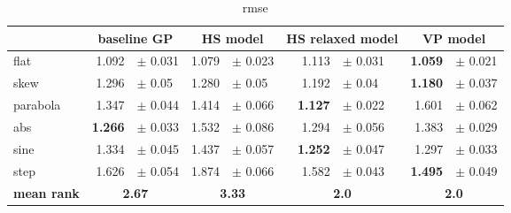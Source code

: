 \begin{table}[] 
 \centering
\begin{tabular}{lrlrlrlrl}
\hline
 &  \multicolumn{2}{c}{baseline GP}  &  \multicolumn{2}{c}{HS model}  &  \multicolumn{2}{c}{HS relaxed model}  &  \multicolumn{2}{c}{VP model}  \\
\hline
flat & 1.092 & $\pm$ 0.031 & 1.079 & $\pm$ 0.023 & 1.113 & $\pm$ 0.031 & \textbf{1.059} & $\pm$ 0.021 \\
skew & 1.296 & $\pm$ 0.05 & 1.280 & $\pm$ 0.05 & 1.192 & $\pm$ 0.04 & \textbf{1.180} & $\pm$ 0.037 \\
parabola & 1.347 & $\pm$ 0.044 & 1.414 & $\pm$ 0.066 & \textbf{1.127} & $\pm$ 0.022 & 1.601 & $\pm$ 0.062 \\
abs & \textbf{1.266} & $\pm$ 0.033 & 1.532 & $\pm$ 0.086 & 1.294 & $\pm$ 0.056 & 1.383 & $\pm$ 0.029 \\
sine & 1.334 & $\pm$ 0.045 & 1.437 & $\pm$ 0.057 & \textbf{1.252} & $\pm$ 0.047 & 1.297 & $\pm$ 0.033 \\
step & 1.626 & $\pm$ 0.054 & 1.874 & $\pm$ 0.066 & 1.582 & $\pm$ 0.043 & \textbf{1.495} & $\pm$ 0.049 \\
\hline
\textbf{mean rank} & \multicolumn{2}{c}{\textbf{2.67}} & \multicolumn{2}{c}{\textbf{3.33}} & \multicolumn{2}{c}{\textbf{2.0}} & \multicolumn{2}{c}{\textbf{2.0}}\\
\hline
\end{tabular}
\caption{rmse}
\label{tab:rmse}
\end{table}

